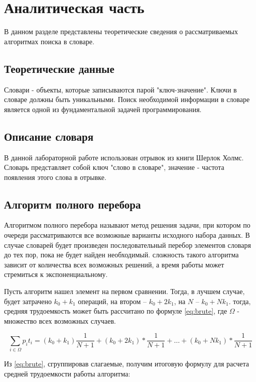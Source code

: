 \chapter{Аналитическая часть}

В данном разделе представлены теоретические сведения о рассматриваемых алгоритмах поиска в словаре.

\section{Теоретические данные}
Словари - объекты, которые записываются парой "ключ-значение". Ключи в словаре должны быть уникальными. Поиск необходимой информации в словаре является одной из фундаментальной задачей программирования.

\section{Описание словаря}
В данной лабораторной работе использован отрывок из книги Шерлок Холмс. Словарь представляет собой ключ "слово в словаре", значение - частота появления этого слова в отрывке.

\section{Алгоритм полного перебора}
Алгоритмом полного перебора называют метод решения задачи, при котором по очереди рассматриваются все возможные варианты исходного набора данных. В случае словарей будет произведен последовательный перебор элементов словаря до тех пор, пока не будет найден необходимый. сложность такого алгоритма зависит от количества всех возможных решений, а время работы может стремиться к экспоненциальному.

Пусть алгоритм нашел элемент на первом сравнении. Тогда, в лучшем случае, будет затрачено $k_0 + k_1$ операций, на втором -- $k_0 + 2k_1$, на $N$ -- $k_0 + Nk_1$. тогда, средняя трудоемкость может быть рассчитано по формуле \eqref{eq:brute}, где $\Omega$ - множество всех возможных случаев.

\begin{equation}
	\label{eq:brute}
	\sum_{i \in \Omega} p_i t_i = (k_0 + k_1) \frac{1}{N + 1} + (k_0 + 2k_1) * \frac{1}{N + 1} + \dots + (k_0 + Nk_1) * \frac{1}{N + 1} 
\end{equation}

Из \eqref{eq:brute}, сгруппировав слагаемые, получим итоговую формулу для расчета средней трудоемкости работы алгоритма:

